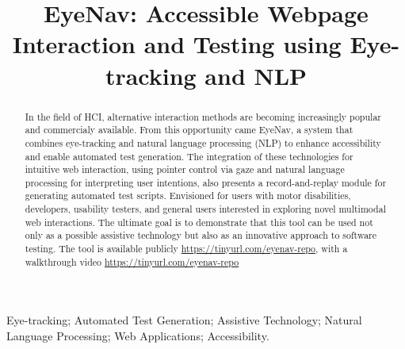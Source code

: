 \documentclass[10pt, conference]{IEEEtran}
\begin{document}
\title{EyeNav: Accessible Webpage Interaction and Testing using Eye-tracking and NLP}

\author{
}

\maketitle

\begin{abstract}
In the field of \ac{HCI}, alternative interaction methods are becoming increasingly popular and commercialy available. From this opportunity came EyeNav, a system that combines eye-tracking and natural language processing (NLP) to enhance accessibility and enable automated test generation. The integration of these technologies for intuitive web interaction, using pointer control via gaze and natural language processing for interpreting user intentions, also presents a record-and-replay module for generating automated test scripts. Envisioned for users with motor disabilities, developers, usability testers, and general users interested in exploring novel multimodal web interactions.
The ultimate goal is to demonstrate that this tool can be used not only as a possible assistive technology but also as an innovative approach to software testing. The tool is available publicly \href{https://tinyurl.com/eyenav-repo}{https://tinyurl.com/eyenav-repo}, with a walkthrough video \href{https://tinyurl.com/eyenav-repo}{https://tinyurl.com/eyenav-repo} %
\end{abstract}


\begin{IEEEkeywords}
Eye-tracking; Automated Test Generation; Assistive Technology; Natural Language Processing; Web Applications; Accessibility.
\end{IEEEkeywords}
\end{document}
